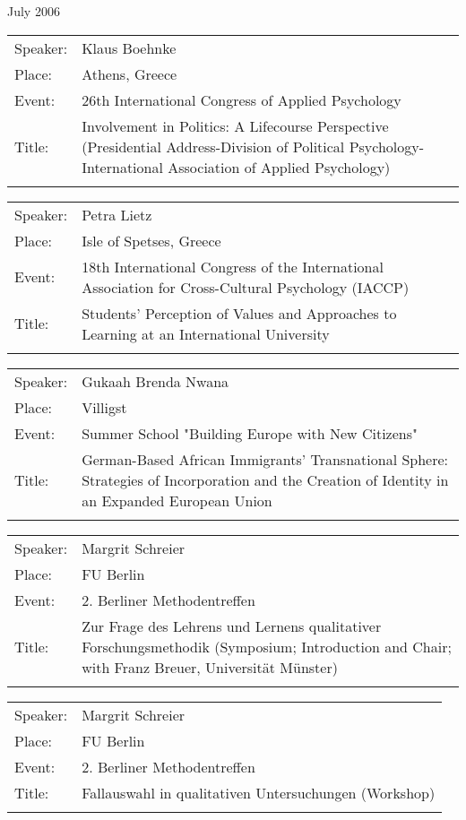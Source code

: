 {\begin{flushleft}
July 2006\\[0.5cm] 
\end{flushleft}
\begin{tabular}{lp{13.4cm}}
 Speaker:	&  Klaus Boehnke\\
 Place: 	 &Athens, Greece\\
 Event:   &	26th International Congress of Applied Psychology\\
 Title: &	Involvement in Politics: A Lifecourse Perspective (Presidential Address-Division of Political Psychology-International Association of Applied Psychology)\\ \\
\end{tabular}
\begin{tabular}{lp{13.4cm}}
 Speaker:	&  Petra Lietz\\
 Place: 	 &Isle of Spetses, Greece\\
 Event:   &	18th International Congress of the International Association for Cross-Cultural Psychology (IACCP)\\
 Title: &	Students' Perception of Values and Approaches to Learning at an International University\\ \\
\end{tabular}
\begin{tabular}{lp{13.4cm}}
 Speaker:	& Gukaah Brenda Nwana\\
 Place: 	 &Villigst\\
 Event:   &	Summer School "Building Europe with New Citizens"\\
 Title: &	German-Based African Immigrants' Transnational Sphere: Strategies of Incorporation and the Creation of Identity in an Expanded European Union\\ \\
\end{tabular}
\begin{tabular}{lp{13.4cm}}
 Speaker:	& Margrit Schreier\\
 Place: 	 &FU Berlin\\
 Event:   &	2. Berliner Methodentreffen\\
 Title: &	Zur Frage des Lehrens und Lernens qualitativer Forschungsmethodik (Symposium; Introduction and Chair; with Franz Breuer, Universit\"{a}t M\"{u}nster)\\ \\
\end{tabular}
\begin{tabular}{lp{13.4cm}}
 Speaker:	& Margrit Schreier\\
 Place: 	 &FU Berlin\\
 Event:   &	2. Berliner Methodentreffen\\
 Title: &	Fallauswahl in qualitativen Untersuchungen (Workshop)\\ \\
\end{tabular}






}
